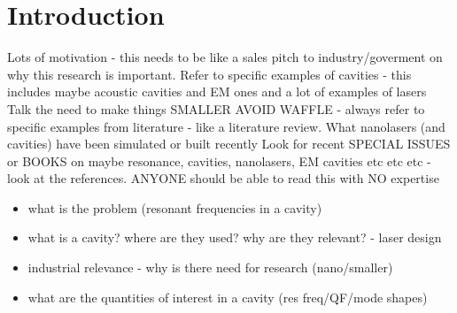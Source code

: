\chapter{Introduction} %
\label{Chapter1}

Lots of motivation - this needs to be like a sales pitch to industry/goverment on why this research is important.
Refer to specific examples of cavities - this includes maybe acoustic cavities and EM ones and a lot of examples of lasers
Talk the need to make things SMALLER
AVOID WAFFLE - always refer to specific examples from literature - like a literature review.
What nanolasers (and cavities) have been simulated or built recently
Look for recent SPECIAL ISSUES or BOOKS on maybe resonance, cavities, nanolasers, EM cavities etc etc etc - look at the references.
ANYONE should be able to read this with NO expertise

\begin{itemize}
	\item what is the problem (resonant frequencies in a cavity)
	\item what is a cavity? where are they used? why are they relevant? - laser design
	\item industrial relevance - why is there need for research (nano/smaller)
  \item what are the quantities of interest in a cavity (res freq/QF/mode shapes)
\end{itemize}
